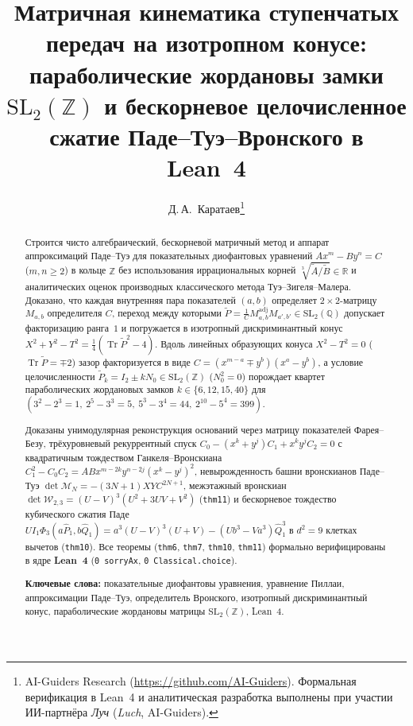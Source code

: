 \documentclass[11pt,a4paper]{article}
\title{\textbf{Матричная кинематика ступенчатых передач на изотропном конусе:\\ параболические жордановы замки $\mathrm{SL}_2(\mathbb{Z})$ и бескорневое целочисленное сжатие Паде--Туэ--Вронского в Lean~4}}
\author{Д.\,А.~Каратаев\thanks{AI-Guiders Research (\url{https://github.com/AI-Guiders}). Формальная верификация в Lean~4 и аналитическая разработка выполнены при участии ИИ-партнёра \emph{Луч} (\emph{Luch}, AI-Guiders).}}
\date{}
\theoremstyle{plain}
\theoremstyle{definition}
\begin{document}
\maketitle

\begin{abstract}
Строится чисто алгебраический, бескорневой матричный метод и аппарат аппроксимаций Паде--Туэ для показательных диофантовых уравнений $A x^m - B y^n = C$ ($m,n\ge 2$) в кольце $\mathbb{Z}$ без использования иррациональных корней $\sqrt[3]{\widetilde{A}/\widetilde{B}}\in\mathbb{R}$ и аналитических оценок производных классического метода Туэ--Зигеля--Малера. Доказано, что каждая внутренняя пара показателей $(a,b)$ определяет $2\times 2$-матрицу $M_{a,b}$ определителя $C$, переход между которыми $\widetilde{P} = \frac{1}{C}M_{a,b}^{\mathrm{adj}}M_{a',b'}\in\mathrm{SL}_2(\mathbb{Q})$ допускает факторизацию ранга~$1$ и погружается в изотропный дискриминантный конус $X^2 + Y^2 - T^2 = \frac{1}{4}(\operatorname{Tr}\widetilde{P}^2 - 4)$. Вдоль линейных образующих конуса $X^2 - T^2 = 0$ ($\operatorname{Tr}\widetilde{P} = \mp 2$) зазор факторизуется в виде $C = (x^{m-a}\mp y^b)(x^a - y^b)$, а условие целочисленности $\widetilde{P}_k = I_2 \pm k N_0\in\mathrm{SL}_2(\mathbb{Z})$ ($N_0^2 = 0$) порождает квартет параболических жордановых замков $k\in\{6,12,15,40\}$ для $(3^2-2^3=1,\ 2^5-3^3=5,\ 5^3-3^4=44,\ 2^{10}-5^4=399)$.

Доказаны унимодулярная реконструкция оснований через матрицу показателей Фарея--Безу, трёхуровневый рекуррентный спуск $C_0 - (x^k+y^j)C_1 + x^k y^j C_2 = 0$ с квадратичным тождеством Ганкеля--Вронскиана $C_1^2 - C_0 C_2 = A B x^{m-2k}y^{n-2j}(x^k-y^j)^2$, невырожденность башни вронскианов Паде--Туэ $\det\mathcal{M}_N = -(3N+1)X Y C^{2N+1}$, межэтажный вронскиан $\det\mathcal{W}_{2,3} = (U-V)^3(U^2+3UV+V^2)$ (\texttt{thm11}) и бескорневое тождество кубического сжатия Паде $U I_1 \Phi_3(a\widehat{P}_1, b\widehat{Q}_1) = a^3(U-V)^3(U+V) - (U b^3 - V a^3)\widehat{Q}_1^3$ в $d^2=9$ клетках вычетов (\texttt{thm10}). Все теоремы (\texttt{thm6}, \texttt{thm7}, \texttt{thm10}, \texttt{thm11}) формально верифицированы в ядре \textbf{Lean~4} (\texttt{0 sorryAx}, \texttt{0 Classical.choice}).

\medskip\noindent
\textbf{Ключевые слова:} показательные диофантовы уравнения, уравнение Пиллаи, аппроксимации Паде--Туэ, определитель Вронского, изотропный дискриминантный конус, параболические жордановы матрицы $\mathrm{SL}_2(\mathbb{Z})$, Lean~4.
\end{abstract}
\end{document}
